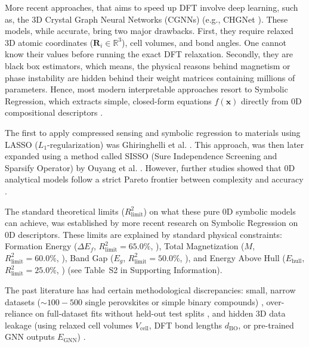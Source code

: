 \documentclass[journal=jcisd8,manuscript=article]{achemso}
\begin{document}
More recent approaches, that aims to speed up DFT involve deep learning, such as, the 3D Crystal Graph Neural Networks (CGNNs) (e.g., CHGNet \cite{chgnet}). These models, while accurate, bring two major drawbacks. First, they require relaxed 3D atomic coordinates ($\mathbf{R}_i \in \mathbb{R}^3$), cell volumes, and bond angles. One cannot know their values before running the exact DFT relaxation. Secondly, they are black box estimators, which means, the physical reasons behind magnetism or phase instability are hidden behind their weight matrices containing millions of parameters. Hence, most modern interpretable approaches resort to Symbolic Regression, which extracts simple, closed-form equations $f(\mathbf{x})$ directly from 0D compositional descriptors \cite{schmidt2009distilling, rissanen1978modeling}.

The first to apply compressed sensing and symbolic regression to materials using LASSO ($L_1$-regularization) was Ghiringhelli et al. \cite{ghiringhelli2015bigdata}. This approach, was then later expanded using a method called SISSO (Sure Independence Screening and Sparsify Operator) by Ouyang et al. \cite{ouyang2018sisso}. However, further studies showed that 0D analytical models follow a strict Pareto frontier between complexity and accuracy \cite{rissanen1978modeling, ouyang2018sisso}.

The standard theoretical limits ($R^2_{\text{limit}}$) on what these pure 0D symbolic models can achieve, was established by more recent research on Symbolic Regression on 0D descriptors. These limits are explained by standard physical constraints: Formation Energy ($\Delta E_f$, $R^2_{\text{limit}} = 65.0\%$, \cite{ouyang2018sisso, bartel2019new}), Total Magnetization ($M$, $R^2_{\text{limit}} = 60.0\%$, \cite{ghiringhelli2015bigdata, lejaeghere2016reproducibility}), Band Gap ($E_g$, $R^2_{\text{limit}} = 50.0\%$, \cite{ouyang2018sisso, borlido2019large}), and Energy Above Hull ($E_{\text{hull}}$, $R^2_{\text{limit}} = 25.0\%$, \cite{bartel2019sciadv, sun2016thermodynamic}) (see Table~S2 in Supporting Information).

The past literature has had certain methodological discrepancies: small, narrow datasets ($\sim 100 - 500$ single perovskites or simple binary compounds) \cite{ghiringhelli2015bigdata, bartel2019new}, over-reliance on full-dataset fits without held-out test splits \cite{ouyang2018sisso, ghiringhelli2015bigdata, rissanen1978modeling}, and hidden 3D data leakage (using relaxed cell volumes $V_{\text{cell}}$, DFT bond lengths $d_{\text{BO}}$, or pre-trained GNN outputs $E_{\text{GNN}}$) \cite{chgnet, kirklin2015open, hautier2012accuracy}.
\end{document}
